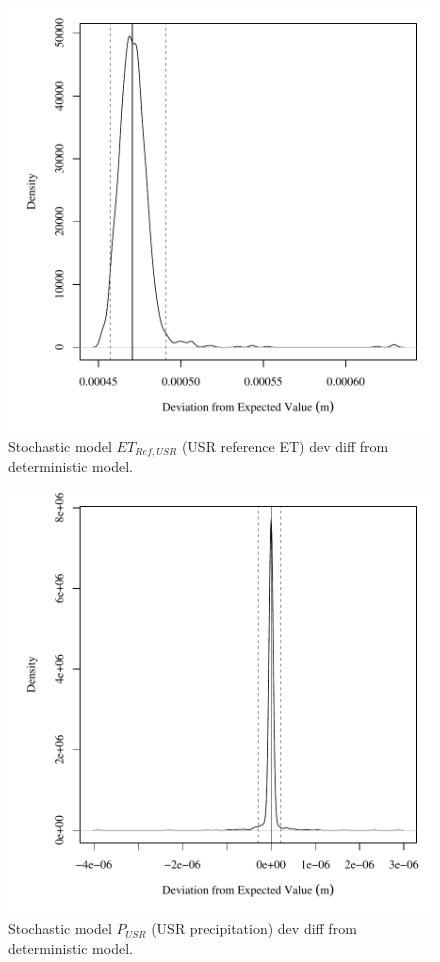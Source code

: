 \begin{center}
\begin{figure}[htbp]
	\includegraphics[width=6in]{"Figures/Results_USR/V dev diff et"}
	\caption{Stochastic model $ET_{Ref,USR}$ (USR reference ET) dev diff from deterministic model.}
\end{figure}
\end{center}
\newpage

\begin{center}
\begin{figure}[htbp]
	\includegraphics[width=6in]{"Figures/Results_USR/V dev diff p"}
	\caption{Stochastic model $P_{USR}$ (USR precipitation) dev diff from deterministic model.}
\end{figure}
\end{center}
\newpage


